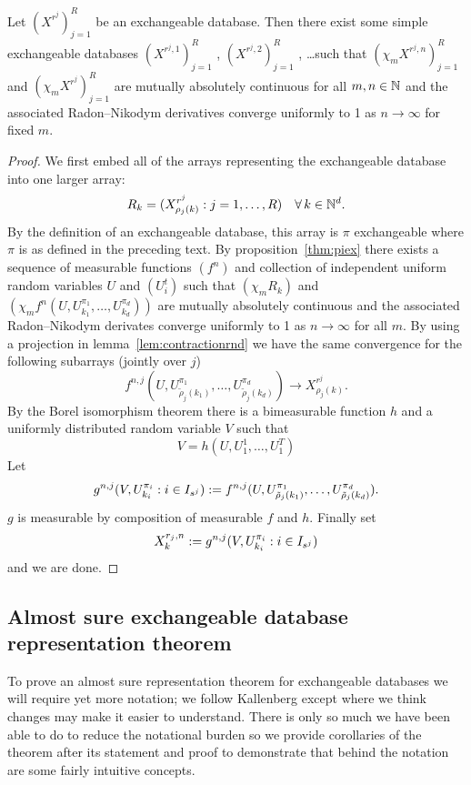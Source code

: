 \begin{thm}
  \label{thm:simple-database}
  Let $(X^{r^j})_{j=1}^R$ be an exchangeable database.
  Then there exist some simple exchangeable databases $(X^{r^j,1})_{j=1}^R$ , $(X^{r^j,2})_{j=1}^R$ , \dots such that
  $(\chi_m X^{r^j,n})_{j=1}^R$ and $(\chi_m X^{r^j})_{j=1}^R$ are mutually absolutely continuous for all $m,n \in \mathbb{N}$ and the associated Radon--Nikodym derivatives converge uniformly to 1 as $n \to \infty$ for fixed $m$.
\end{thm}

\begin{proof}
  We first embed all of the arrays representing the exchangeable database into one larger array:
  \[
    R_{k} = (X^{r^j}_{\rho_j(k)} : j = 1,\dots,R) \quad \forall \, k \in \mathbb{N}^d.
  \]
  By the definition of an exchangeable database, this array is $\pi$ exchangeable where $\pi$ is as defined in the preceding text.
  By proposition~\ref{thm:piex} there exists a sequence of measurable functions $(f^n)$ and collection of independent uniform random variables $U$ and $(U^t_i)$ such that $(\chi_m R_{k})$ and $(\chi_m f^n(U, U^{\pi_1}_{k_1}, \dots, U^{\pi_d}_{k_d}))$ are mutually absolutely continuous and the associated Radon--Nikodym derivates converge uniformly to 1 as $n \to \infty$ for all $m$.
  By using a projection in lemma~\ref{lem:contractionrnd} we have the same convergence for the following subarrays (jointly over $j$)
  \[
    f^{n,j}(U, U^{\pi_1}_{\tilde{\rho}_j(k_1)}, \dots, U^{\pi_d}_{\tilde{\rho}_j(k_d)}) \to X^{r^j}_{\rho_j(k)}.
  \]
  By the Borel isomorphism theorem there is a bimeasurable function $h$ and a uniformly distributed random variable $V$ such that
  \[
    V = h(U, U^1_1, \dots, U^T_1)
  \]
  Let
  \[
    g^{n,j}(V, U^{\pi_i}_{k_i} : i \in I_{s^j}) := f^{n,j}(U, U^{\pi_1}_{\tilde{\rho}_j(k_1)}, \dots, U^{\pi_d}_{\tilde{\rho}_j(k_d)}).
  \]
  $g$ is measurable by composition of measurable $f$ and $h$.
  Finally set
  \[
    X^{r_j,n}_{k} := g^{n,j}(V, U^{\pi_i}_{k_i} : i \in I_{s^j})
  \]
  and we are done.
\end{proof}

\subsection{Almost sure exchangeable database representation theorem}

To prove an almost sure representation theorem for exchangeable databases we will require yet more notation; we follow Kallenberg except where we think changes may make it easier to understand.
There is only so much we have been able to do to reduce the notational burden so we provide corollaries of the theorem after its statement and proof to demonstrate that behind the notation are some fairly intuitive concepts.

